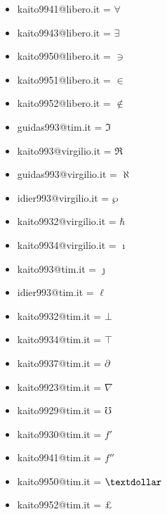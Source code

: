 \documentclass[12pt, a4paper] {article} %
\begin{document}
\begin{itemize}
		\item kaito9941@libero.it = $\forall$ \\
		\item kaito9943@libero.it = $\exists$ \\
		\item kaito9950@libero.it = $\ni$ \\
		\item kaito9951@libero.it = $\in$ \\
		\item kaito9952@libero.it = $\notin$ \\
		\item guidas993@tim.it = $\Im$ \\
		\item kaito993@virgilio.it = $\Re$ \\
		\item guidas993@virgilio.it = $\aleph$ \\
		\item idier993@virgilio.it = $\wp$ \\
		\item kaito9932@virgilio.it = $\hbar$ \\
		\item kaito9934@virgilio.it = $\imath$ \\
		\item kaito993@tim.it = $\jmath$ \\
		\item idier993@tim.it = $\ell$ \\
		\item kaito9932@tim.it = $\bot$ \\
		\item kaito9934@tim.it = $\top$ \\
		\item kaito9937@tim.it = $\partial$ \\
		\item kaito9923@tim.it = $\nabla$ \\
		\item kaito9929@tim.it = $\mho$ \\
		\item kaito9930@tim.it = $f'$ \\
		\item kaito9941@tim.it = $f''$ \\
		\item kaito9950@tim.it = $\textdollar$ \\
		\item kaito9952@tim.it = $\pounds$ \\

\end{itemize}
\end{document}

